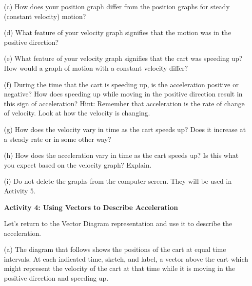 \pagebreak[2]
(c) How does your position graph differ from the position graphs for steady
(constant velocity) motion? 
\vspace{13mm}

(d) What feature of your velocity graph signifies that the motion was in the positive direction? 
\vspace{13mm}

(e) What feature of your velocity graph signifies that the cart was speeding
up? How would a graph of motion with a constant velocity differ? 
\vspace{13mm}

(f) During the time that the cart is speeding up, is the acceleration positive
or negative? How does speeding up while moving in the positive direction result
in this sign of acceleration? Hint: Remember that acceleration is the rate of
change of velocity. Look at how the velocity is changing. 
\vspace{13mm}

(g) How does the velocity vary in time as the cart speeds up? Does it increase
at a steady rate or in some other way? 
\vspace{13mm}

(h) How does the acceleration vary in time as the cart speeds up? Is this what
you expect based on the velocity graph? Explain.
\vspace{13mm}

(i) Do not delete the graphs from the computer screen.  They will be used in Activity 5.
\vspace{10mm}

\textbf{Activity 4: Using Vectors to Describe Acceleration} 

Let's return to the Vector Diagram representation and use it to describe the
acceleration.

(a) The diagram that follows shows the positions of the cart at equal time intervals.
At each indicated time, sketch, and label, a vector above the cart which might represent
the velocity of the cart at that time while it is moving in the positive direction and speeding up.

